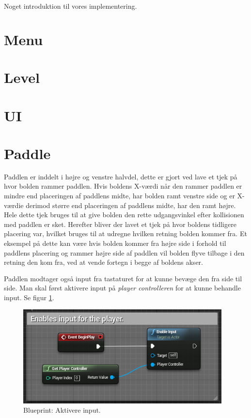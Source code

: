 Noget introduktion til vores implementering.

\section{Menu}


\section{Level}


\section{UI}


\section{Paddle}
Paddlen er inddelt i højre og venstre halvdel, dette er gjort ved lave et tjek på hvor bolden rammer paddlen. Hvis boldens X-værdi når den rammer paddlen er mindre end placeringen af paddlens midte, har bolden ramt venstre side og er X-værdie derimod større end placeringen af paddlens midte, har den ramt højre. Hele dette tjek bruges til at give bolden den rette udgangsvinkel efter kollisionen med paddlen er sket. Herefter bliver der lavet et tjek på hvor boldens tidligere placering var, hvilket bruges til at udregne hvilken retning bolden kommer fra. Et eksempel på dette kan være hvis bolden kommer fra højre side i forhold til paddlens placering og rammer højre side af paddlen vil bolden flyve tilbage i den retning den kom fra, ved at vende fortegn i begge af boldens akser.

Paddlen modtager også input fra tastaturet for at kunne bevæge den fra side til side. Man skal først aktivere input på \textit{player controlleren} for at kunne behandle input. Se figur \ref{dia:paddleenableinput}. 

\begin{figure}
	\begin{center}
		\caption{Blueprint: Aktivere input.}
		\label{dia:paddleenableinput}
		\includegraphics[width=0.80\linewidth]{pictures/blueprints/paddle-enable-input}
		\end{center}
\end{figure}

